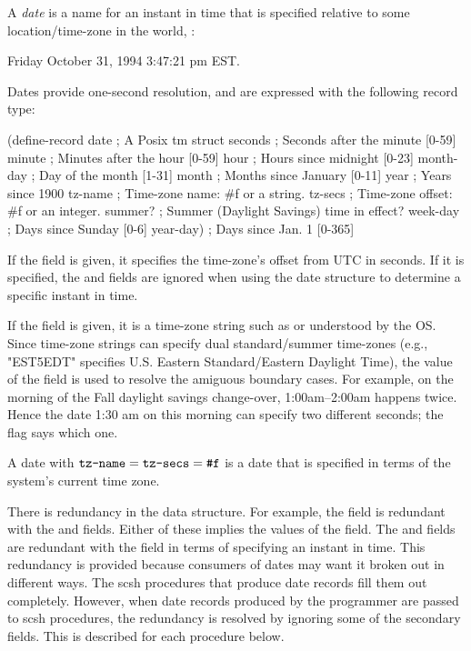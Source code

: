 A \emph{date} is a name for an instant in time that is specified
relative to some location/time-zone in the world, \eg:
\begin{tightinset}
    Friday October 31, 1994 3:47:21 pm EST.
\end{tightinset}
Dates provide one-second resolution, 
and are expressed with the following record type:
%
\begin{code}
(define-record date     ; A Posix tm struct
  seconds       ; Seconds after the minute [0-59]
  minute        ; Minutes after the hour [0-59]
  hour          ; Hours since midnight [0-23]
  month-day     ; Day of the month [1-31]
  month         ; Months since January [0-11]
  year          ; Years since 1900
  tz-name       ; Time-zone name: #f or a string.
  tz-secs       ; Time-zone offset: #f or an integer.
  summer?       ; Summer (Daylight Savings) time in effect?
  week-day      ; Days since Sunday [0-6]
  year-day)     ; Days since Jan. 1 [0-365]\end{code}
%
If the  field is given, it specifies the time-zone's offset from
UTC in seconds. If it is specified, the  and 
fields are ignored when using the date structure to determine a specific
instant in time.

If the  field is given, it is a time-zone string such as 
 or  understood by the OS.
Since {\Posix} time-zone strings can specify dual standard/summer time-zones
(e.g., "EST5EDT" specifies U.S. Eastern Standard/Eastern Daylight Time),
the value of the  field is used to resolve the amiguous
boundary cases. For example, on the morning of the Fall daylight savings
change-over, 1:00am--2:00am happens twice. Hence the date 1:30 am
on this morning can specify two different seconds; 
the  flag says which one.

A date with $\ex{tz-name} = \ex{tz-secs} = \ex{\#f}$ is a date that
is specified in terms of the system's current time zone.

There is redundancy in the  data structure.
For example, the  field is redundant
with the  and  fields.
Either of these implies the values of the  field.
The  and  fields are redundant with the 
field in terms of specifying an instant in time.
This redundancy is provided because consumers of dates may want it broken out
in different ways.
The scsh procedures that produce date records fill them out completely.
However, when date records produced by the programmer are passed to
scsh procedures, the redundancy is resolved by ignoring some of the
secondary fields. 
This is described for each procedure below.

